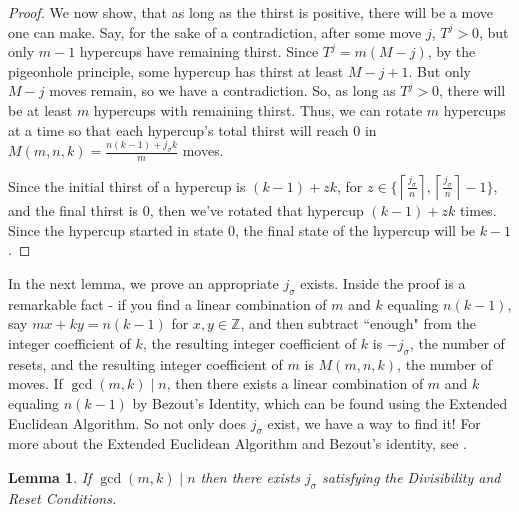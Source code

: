 \documentclass{article}
\theoremstyle{theorem}
\newtheorem{lemma}[theorem]{Lemma}
\theoremstyle{definition}
\begin{document}
\begin{proof}
  We now show, that as long as the thirst is positive, there will be a move one can make. Say, for the sake of a contradiction, after some move $j$, $T^j>0$, but only $m-1$ hypercups have remaining thirst. Since $T^j = m(M-j)$, by the pigeonhole principle, some hypercup has thirst at least $M-j+1$. But only $M-j$ moves remain, so we have a contradiction. So, as long as $T^j>0$, there will be at least $m$ hypercups with remaining thirst. Thus, we can rotate $m$ hypercups at a time so that each hypercup's total thirst will reach $0$ in $M(m,n,k) = \frac{n(k-1)+j_\sigma k}{m}$ moves. 

 
  
  Since the initial thirst of a hypercup is $(k-1)+zk$, for $z\in \{\left\lceil \frac{j_{\sigma}}{n}\right\rceil, \left\lceil\frac{j_{\sigma}}{n}  \right\rceil- 1\}$, and the final thirst is $0$, then we've rotated that hypercup $(k-1)+zk$ times. Since the hypercup started in state $0$, the final state of the hypercup will be $k-1$.
\end{proof}

In the next lemma, we prove an appropriate $j_\sigma$ exists. Inside the proof is a remarkable fact - if you find a linear combination of $m$ and $k$ equaling $n(k-1)$, say $mx+ky = n(k-1)$ for $x,y\in \mathbb{Z}$, and then subtract ``enough" from the integer coefficient of $k$, the resulting integer coefficient of $k$ is $-j_\sigma$, the number of resets, and the resulting integer coefficient of $m$ is $M(m,n,k)$, the number of moves. If $\gcd(m,k)\mid n$, then there exists a linear combination of $m$ and $k$ equaling $n(k-1)$ by Bezout's Identity, which can be found using the Extended Euclidean Algorithm. So not only does $j_\sigma$ exist, we have a way to find it! For more about the Extended Euclidean Algorithm and Bezout's identity, see \cite{NumberTheory}.

\begin{lemma}\label{lem:jsigexists}
    If $\gcd(m,k)\mid n$ then there exists $j_\sigma$ satisfying the Divisibility and Reset Conditions.
\end{lemma}
\end{document}
